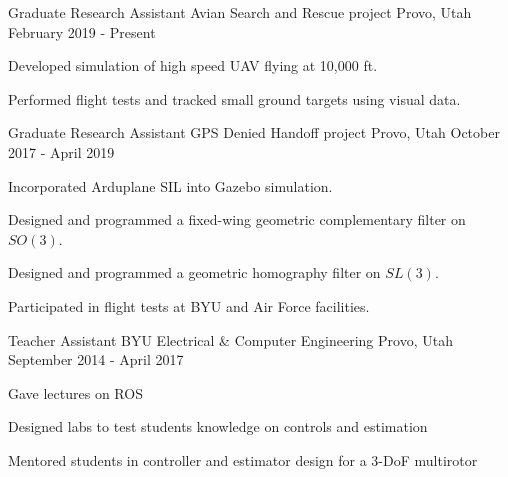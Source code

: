 

\begin{cventries}

  \cventry
    {Graduate Research Assistant} %
    {Avian Search and Rescue project} %
    {Provo, Utah} %
    {February 2019 - Present} %
    {
      \begin{cvitems}
      \item Developed simulation of high speed UAV flying at 10,000 ft.
      \item Performed flight tests and tracked small ground targets using visual data.
      \end{cvitems}
    }
  \cventry
    {Graduate Research Assistant} %
    {GPS Denied Handoff project} %
    {Provo, Utah} %
    {October 2017 - April 2019} %
    {
      \begin{cvitems}
        \item Incorporated Arduplane SIL into Gazebo simulation.
        \item Designed and programmed a fixed-wing geometric complementary filter on $SO(3)$.
        \item Designed and programmed a geometric homography filter on $SL(3)$.
        \item Participated in flight tests at BYU and Air Force facilities.
      \end{cvitems}
    }
  \cventry
    {Teacher Assistant}
    {BYU Electrical \& Computer Engineering}
    {Provo, Utah}
    {September 2014 - April 2017}
    {
      \begin{cvitems}
        \item Gave lectures on ROS
        \item Designed labs to test students knowledge on controls and estimation
        \item Mentored students in controller and estimator design for a 3-DoF multirotor
      \end{cvitems}
    }


\end{cventries}
